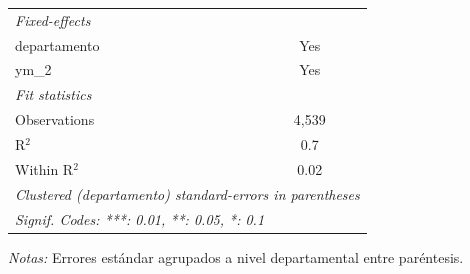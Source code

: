 \documentclass[12pt]{article}
\begin{document}
\begin{table}[htbp]
\begin{threeparttable}
\begin{tabular}{lc}
      \emph{Fixed-effects}\\
      departamento                                                                    & Yes\\  
      ym\_2                                                                           & Yes\\  
      \midrule
      \emph{Fit statistics}\\
      Observations                                                                    & 4,539\\  
      R$^2$                                                                           & 0.7\\  
      Within R$^2$                                                                    & 0.02\\  
      \midrule \midrule
      \multicolumn{2}{l}{\emph{Clustered (departamento) standard-errors in parentheses}}\\
      \multicolumn{2}{l}{\emph{Signif. Codes: ***: 0.01, **: 0.05, *: 0.1}}\\
   \end{tabular}


\begin{tablenotes}
\footnotesize
\item \textit{Notas:} Errores estándar agrupados a nivel departamental entre paréntesis.
\end{tablenotes}
\end{threeparttable}
\end{table}
\end{document}
